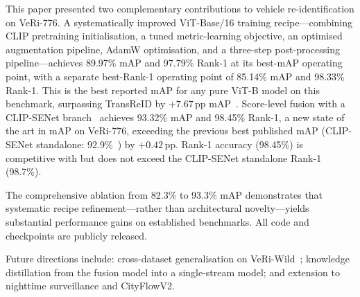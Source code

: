 \documentclass[11pt]{article}
\begin{document}
This paper presented two complementary contributions to vehicle
re-identification on VeRi-776. A systematically improved ViT-Base/16
training recipe---combining CLIP pretraining initialisation, a tuned
metric-learning objective, an optimised augmentation pipeline, AdamW
optimisation, and a three-step post-processing pipeline---achieves 89.97\%
mAP and 97.79\% Rank-1 at its best-mAP operating point, with a separate
best-Rank-1 operating point of 85.14\% mAP and 98.33\% Rank-1. This is the
best reported mAP for any pure ViT-B model on this benchmark, surpassing
TransReID by $+7.67$\,pp mAP~\cite{he2021transreid}. Score-level fusion with
a CLIP-SENet branch~\cite{lu2025clipsenet} achieves 93.32\% mAP and 98.45\%
Rank-1, a new state of the art in mAP on VeRi-776, exceeding the
previous best published mAP (CLIP-SENet standalone: 92.9\%~\cite{lu2025clipsenet})
by $+0.42$\,pp. Rank-1 accuracy (98.45\%) is competitive with but does not
exceed the CLIP-SENet standalone Rank-1 (98.7\%).

The comprehensive ablation from 82.3\% to 93.3\% mAP demonstrates that
systematic recipe refinement---rather than architectural novelty---yields
substantial performance gains on established benchmarks. All code and
checkpoints are publicly released.

Future directions include: cross-dataset generalisation on
VeRi-Wild~\cite{lou2019veriwild}; knowledge distillation from the fusion model
into a single-stream model; and extension to nighttime surveillance and
CityFlowV2.



\end{document}
